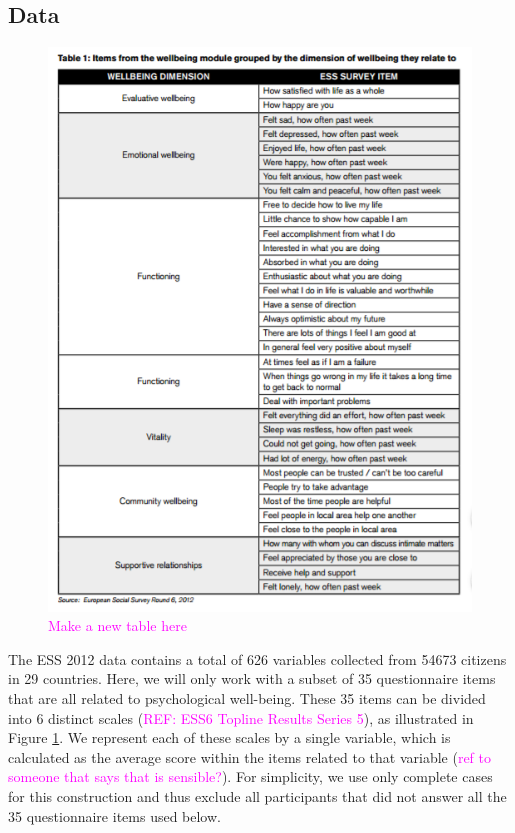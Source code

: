 \documentclass[titlepage,11pt,twoside]{article}
\newcommand{\hl}[1]{\textcolor{magenta}{#1}}
\begin{document}
\subsection{Data}
\begin{figure}
\center
\includegraphics[scale=1]{surveyTable.png}
\caption{\hl{Make a new table here}}
\label{surveyTable}
\end{figure}
The ESS 2012 data contains a total of 626 variables collected from 54673 citizens in 29 countries. Here, we will only work with a subset of 35 questionnaire items that are all related to psychological well-being. These 35 items can be divided into 6 distinct scales (\hl{REF: ESS6 Topline Results Series 5}), as illustrated in Figure \ref{surveyTable}. We represent each of these scales by a single variable, which is calculated as the average score within the items related to that variable (\hl{ref to someone that says that is sensible?}). For simplicity, we use only complete cases for this construction and thus exclude all participants that did not answer all the 35 questionnaire items used below.
\end{document}
